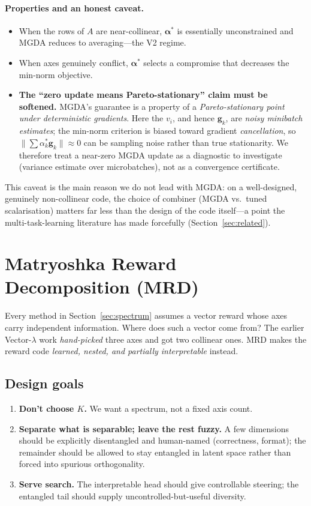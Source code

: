 \documentclass[11pt,a4paper]{article}
\begin{document}
\paragraph{Properties and an honest caveat.}
\begin{itemize}[nosep]
\item When the rows of $A$ are near-collinear, $\bm\alpha^*$ is essentially
  unconstrained and MGDA reduces to averaging---the V2 regime.
\item When axes genuinely conflict, $\bm\alpha^*$ selects a compromise that
  decreases the min-norm objective.
\item \textbf{The ``zero update means Pareto-stationary'' claim must be
  softened.}  MGDA's guarantee is a property of a \emph{Pareto-stationary
  point under deterministic gradients}.  Here the $v_i$, and hence
  $\bm g_k$, are \emph{noisy minibatch estimates}; the min-norm criterion is
  biased toward gradient \emph{cancellation}, so $\|\sum\alpha^*_k\bm
  g_k\|\!\approx\!0$ can be sampling noise rather than true stationarity.
  We therefore treat a near-zero MGDA update as a diagnostic to investigate
  (variance estimate over microbatches), not as a convergence certificate.
\end{itemize}
This caveat is the main reason we do not lead with MGDA: on a well-designed,
genuinely non-collinear code, the choice of combiner (MGDA vs.\ tuned
scalarisation) matters far less than the design of the code itself---a point
the multi-task-learning literature has made forcefully
(Section~\ref{sec:related}).

\section{Matryoshka Reward Decomposition (MRD)}
\label{sec:mrd}

Every method in Section~\ref{sec:spectrum} assumes a vector reward whose
axes carry independent information.  Where does such a vector come from?
The earlier Vector-$\lambda$ work \emph{hand-picked} three axes and got two
collinear ones.  MRD makes the reward code \emph{learned, nested, and
partially interpretable} instead.

\subsection{Design goals}

\begin{enumerate}[nosep]
\item \textbf{Don't choose $K$.}  We want a spectrum, not a fixed axis count.
\item \textbf{Separate what is separable; leave the rest fuzzy.}  A few
  dimensions should be explicitly disentangled and human-named (correctness,
  format); the remainder should be allowed to stay entangled in latent
  space rather than forced into spurious orthogonality.
\item \textbf{Serve search.}  The interpretable head should give controllable
  steering; the entangled tail should supply uncontrolled-but-useful
  diversity.
\end{enumerate}
\end{document}
